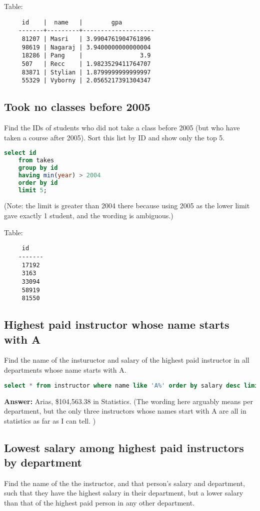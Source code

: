 \documentclass[11pt, oneside]{amsart}   	%
\begin{document}
Table: 
\begin{verbatim}
     id    |  name   |        gpa
    -------+---------+--------------------
     81207 | Masri   | 3.9904761904761896
     98619 | Nagaraj | 3.9400000000000004
     18286 | Pang    |                3.9
     507   | Recc    | 1.9823529411764707
     83871 | Stylian | 1.8799999999999997
     55329 | Vyborny | 2.0565217391304347
\end{verbatim}

\subsection{Took no classes before 2005}

Find the IDs of students who did not take a class before 2005 (but who have taken a course after 2005). Sort this list by ID and show only the top 5.

\begin{lstlisting}[language=SQL]
    select id
    from takes 
    group by id
    having min(year) > 2004
    order by id
    limit 5;
\end{lstlisting}
(Note: the limit is greater than 2004 there because using 2005 as the lower limit gave exactly 1 student, and the wording is ambiguous.)

Table:
\begin{verbatim}
     id
    -------
     17192
     3163
     33094
     58919
     81550
\end{verbatim}

\subsection{Highest paid instructor whose name starts with A}

Find the name of the instuructor and salary of the highest paid instructor in all departments whose name starts with A.
\begin{lstlisting}[language=SQL]
    select * from instructor where name like 'A%' order by salary desc limit 1;
\end{lstlisting}

\textbf{Answer: } Arias, \$104,563.38 in Statistics. (The wording here arguably means per department, but the only three instructors whose names start with A are all in statistics as far as I can tell. )

\subsection{Lowest salary among highest paid instructors by department}
Find the name of the the instructor, and that person's salary and department, such that they have the highest salary in their department, but a lower salary than that of the highest paid person in any other department.
\end{document}
